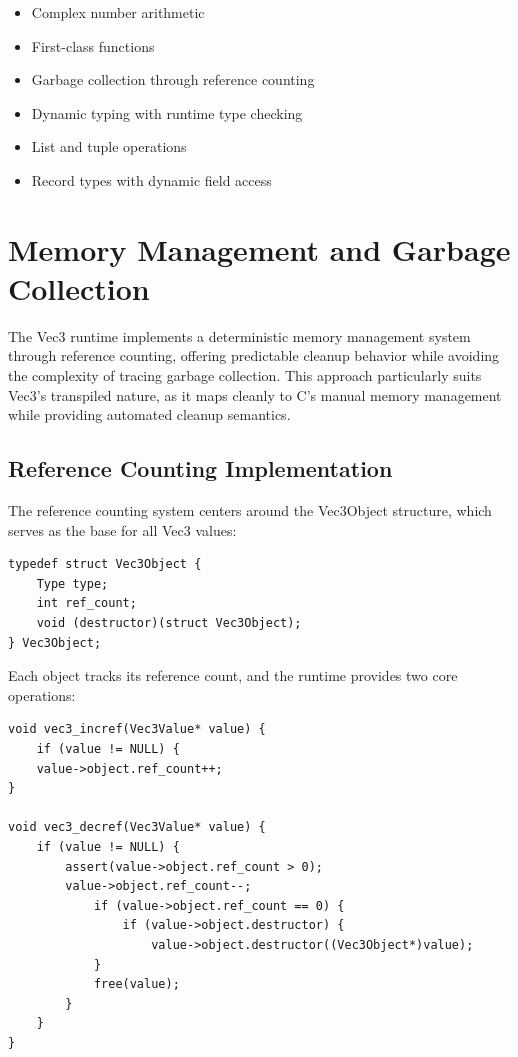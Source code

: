 \begin{itemize}[nolistsep]
\item Complex number arithmetic
\item First-class functions
\item Garbage collection through reference counting
\item Dynamic typing with runtime type checking
\item List and tuple operations
\item Record types with dynamic field access
\end{itemize}

\section{Memory Management and Garbage Collection}
\label{sec:memory-management}

The Vec3 runtime implements a deterministic memory management system through reference counting\citet{christopher1984reference}, offering 
predictable cleanup behavior while avoiding the complexity of tracing garbage collection.
This approach particularly suits Vec3's transpiled nature, as it maps cleanly to C's manual memory management while providing automated cleanup semantics.

\subsection{Reference Counting Implementation}\label{subsec:reference-counting-implementation}
The reference counting system centers around the Vec3Object structure, which serves as the base for all Vec3 values:

\begin{verbatim}
typedef struct Vec3Object {
    Type type;
    int ref_count;
    void (destructor)(struct Vec3Object);
} Vec3Object;
\end{verbatim}

Each object tracks its reference count, and the runtime provides two core operations:

\begin{verbatim}
void vec3_incref(Vec3Value* value) {
    if (value != NULL) {
    value->object.ref_count++;
}

void vec3_decref(Vec3Value* value) {
    if (value != NULL) {
        assert(value->object.ref_count > 0);
        value->object.ref_count--;
            if (value->object.ref_count == 0) {
                if (value->object.destructor) {
                    value->object.destructor((Vec3Object*)value);
            }
            free(value);
        }
    }
}
\end{verbatim}

